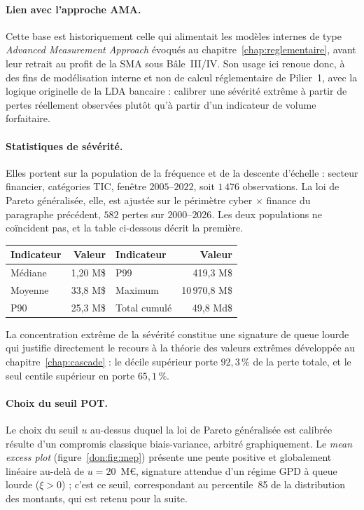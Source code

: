 \paragraph{Lien avec l'approche AMA.} Cette base est historiquement celle
qui alimentait les modèles internes de type \emph{Advanced Measurement
Approach} évoqués au chapitre~\ref{chap:reglementaire}, avant leur retrait au profit de la SMA sous
Bâle~III/IV. Son usage ici renoue donc, à des fins de modélisation interne et
non de calcul réglementaire de Pilier~1, avec la logique originelle de la LDA
bancaire : calibrer une sévérité extrême à partir de pertes réellement
observées plutôt qu'à partir d'un indicateur de volume forfaitaire.

\paragraph{Statistiques de sévérité.} Elles portent sur la population de la fréquence et de la
descente d'échelle : secteur financier, catégories TIC, fenêtre $2005$--$2022$, soit
$1\,476$ observations. La loi de Pareto généralisée, elle, est ajustée sur le périmètre cyber
$\times$ finance du paragraphe précédent, $582$ pertes sur $2000$--$2026$. Les deux populations
ne coïncident pas, et la table ci-dessous décrit la première.

\begin{center}
\renewcommand{\arraystretch}{1.3}
\begin{tabular}{l r l r}
\toprule
\rowcolor{lightblue}
\textbf{Indicateur} & \textbf{Valeur} & \textbf{Indicateur} & \textbf{Valeur} \\
\midrule
Médiane & 1{,}20 M\$ & P99 & 419{,}3 M\$ \\
Moyenne & 33{,}8 M\$ & Maximum & 10\,970{,}8 M\$ \\
P90 & 25{,}3 M\$ & Total cumulé & 49{,}8 Md\$ \\
\bottomrule
\end{tabular}
\end{center}

La concentration extrême de la sévérité constitue une signature de queue lourde qui justifie
directement le recours à la théorie des valeurs extrêmes développée au
chapitre~\ref{chap:cascade} : le décile supérieur porte $92{,}3\,\%$ de la perte totale, et le
seul centile supérieur en porte $65{,}1\,\%$.


\paragraph{Choix du seuil POT.} Le choix du seuil $u$ au-dessus duquel la loi
de Pareto généralisée est calibrée résulte d'un compromis classique
biais-variance, arbitré graphiquement. Le \emph{mean excess plot}
(figure~\ref{don:fig:mep}) présente une pente positive et globalement linéaire
au-delà de $u = 20$~M\euro, signature attendue d'un régime GPD à queue lourde
($\xi > 0$) ; c'est ce seuil, correspondant au percentile~85 de la
distribution des montants, qui est retenu pour la suite.

